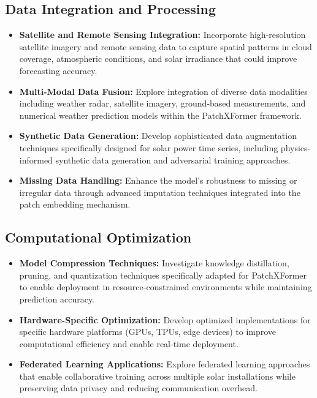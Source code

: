 \documentclass[12pt]{uomthesis}
\begin{document}
\subsection{Data Integration and Processing}

\begin{itemize}
    \item \textbf{Satellite and Remote Sensing Integration:} Incorporate high-resolution satellite imagery and remote sensing data to capture spatial patterns in cloud coverage, atmospheric conditions, and solar irradiance that could improve forecasting accuracy.
    
    \item \textbf{Multi-Modal Data Fusion:} Explore integration of diverse data modalities including weather radar, satellite imagery, ground-based measurements, and numerical weather prediction models within the PatchXFormer framework.
    
    \item \textbf{Synthetic Data Generation:} Develop sophisticated data augmentation techniques specifically designed for solar power time series, including physics-informed synthetic data generation and adversarial training approaches.
    
    \item \textbf{Missing Data Handling:} Enhance the model's robustness to missing or irregular data through advanced imputation techniques integrated into the patch embedding mechanism.
\end{itemize}

\subsection{Computational Optimization}

\begin{itemize}
    \item \textbf{Model Compression Techniques:} Investigate knowledge distillation, pruning, and quantization techniques specifically adapted for PatchXFormer to enable deployment in resource-constrained environments while maintaining prediction accuracy.
    
    \item \textbf{Hardware-Specific Optimization:} Develop optimized implementations for specific hardware platforms (GPUs, TPUs, edge devices) to improve computational efficiency and enable real-time deployment.
    
    \item \textbf{Federated Learning Applications:} Explore federated learning approaches that enable collaborative training across multiple solar installations while preserving data privacy and reducing communication overhead.
\end{itemize}
\end{document}
